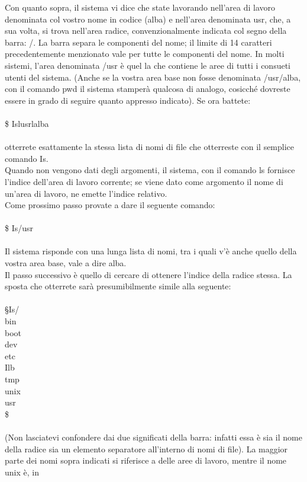 Con quanto sopra, il sistema vi dice che state lavorando nell'area di lavoro
denominata col vostro nome in codice (alba) e nell'area denominata usr, che, a sua volta, si
trova nell'area radice, convenzionalmente indicata col segno della barra: /. La barra
separa le componenti del nome; il limite di 14 caratteri precedentemente menzionato
vale per tutte le componenti del nome. In molti sistemi, l'area denominata /usr è quel
la che contiene le aree di tutti i consueti utenti del sistema. (Anche se la vostra area
base non fosse denominata /usr/alba, con il comando pwd il sistema stamperà qualcosa
di analogo, cosicché dovreste essere in grado di seguire quanto appresso indicato).
Se ora battete:\\\\
\$ Islusrlalba\\\\
otterrete esattamente la stessa lista di nomi di file che otterreste con il semplice
comando Is.\\
Quando non vengono dati degli argomenti, il sistema, con il comando ls fornisce
l'indice dell'area di lavoro corrente; se viene dato come argomento il nome di un'area
di lavoro, ne emette l'indice relativo.\\
Come prossimo passo provate a dare il seguente comando:\\\\
\$ Is/usr\\\\
Il sistema risponde con una lunga lista di nomi, tra i quali v'è anche quello della vostra 
area base, vale a dire alba.\\
Il passo successivo è quello di cercare di ottenere l'indice della radice stessa. La
sposta che otterrete sarà presumibilmente simile alla seguente:\\\\
§Is/\\
bin\\
boot\\
dev\\
etc\\
Ilb\\
tmp\\
unix\\
usr\\
\$\\\\
(Non lasciatevi confondere dai due significati della barra: infatti essa è sia il nome
della radice sia un elemento separatore all'interno di nomi di file). La maggior parte
dei nomi sopra indicati si riferisce a delle aree di lavoro, mentre il nome unix è, in 
